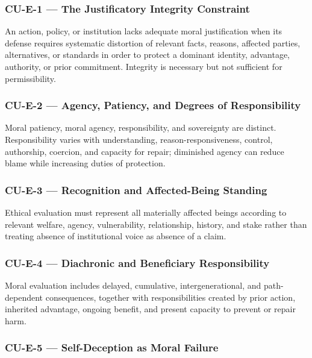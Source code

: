 \documentclass[
  11pt,
]{article}
\begin{document}
\subsubsection{CU-E-1 --- The Justificatory Integrity
Constraint}\label{cu-e-1-the-justificatory-integrity-constraint-1}

An action, policy, or institution lacks adequate moral justification
when its defense requires systematic distortion of relevant facts,
reasons, affected parties, alternatives, or standards in order to
protect a dominant identity, advantage, authority, or prior commitment.
Integrity is necessary but not sufficient for permissibility.

\subsubsection{CU-E-2 --- Agency, Patiency, and Degrees of
Responsibility}\label{cu-e-2-agency-patiency-and-degrees-of-responsibility-1}

Moral patiency, moral agency, responsibility, and sovereignty are
distinct. Responsibility varies with understanding,
reason-responsiveness, control, authorship, coercion, and capacity for
repair; diminished agency can reduce blame while increasing duties of
protection.

\subsubsection{CU-E-3 --- Recognition and Affected-Being
Standing}\label{cu-e-3-recognition-and-affected-being-standing-1}

Ethical evaluation must represent all materially affected beings
according to relevant welfare, agency, vulnerability, relationship,
history, and stake rather than treating absence of institutional voice
as absence of a claim.

\subsubsection{CU-E-4 --- Diachronic and Beneficiary
Responsibility}\label{cu-e-4-diachronic-and-beneficiary-responsibility-1}

Moral evaluation includes delayed, cumulative, intergenerational, and
path-dependent consequences, together with responsibilities created by
prior action, inherited advantage, ongoing benefit, and present capacity
to prevent or repair harm.

\subsubsection{CU-E-5 --- Self-Deception as Moral
Failure}\label{cu-e-5-self-deception-as-moral-failure-1}
\end{document}
